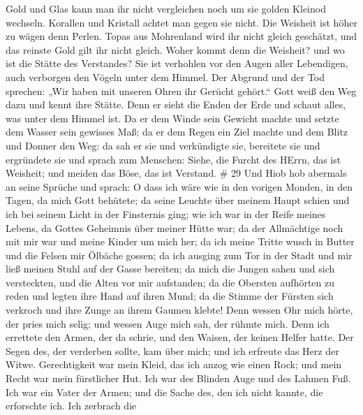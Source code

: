  Gold und Glas kann man ihr nicht vergleichen noch um sie
golden Kleinod wechseln.  Korallen und Kristall achtet man
gegen sie nicht. Die Weisheit ist höher zu wägen denn Perlen.
 Topas aus Mohrenland wird ihr nicht gleich geschätzt, und
das reinste Gold gilt ihr nicht gleich.  Woher kommt denn
die Weisheit? und wo ist die Stätte des Verstandes?  Sie
ist verhohlen vor den Augen aller Lebendigen, auch verborgen den Vögeln
unter dem Himmel.  Der Abgrund und der Tod sprechen: „Wir
haben mit unseren Ohren ihr Gerücht gehört.``  Gott weiß
den Weg dazu und kennt ihre Stätte.  Denn er sieht die
Enden der Erde und schaut alles, was unter dem Himmel ist. 
Da er dem Winde sein Gewicht machte und setzte dem Wasser sein gewisses
Maß;  da er dem Regen ein Ziel machte und dem Blitz und
Donner den Weg:  da sah er sie und verkündigte sie,
bereitete sie und ergründete sie  und sprach zum Menschen:
Siehe, die Furcht des HErrn, das ist Weisheit; und meiden das Böse, das
ist Verstand. \# 29  Und Hiob hob abermals an seine Sprüche
und sprach:  O dass ich wäre wie in den vorigen Monden, in
den Tagen, da mich Gott behütete;  da seine Leuchte über
meinem Haupt schien und ich bei seinem Licht in der Finsternis ging;
 wie ich war in der Reife meines Lebens, da Gottes Geheimnis
über meiner Hütte war;  da der Allmächtige noch mit mir war
und meine Kinder um mich her;  da ich meine Tritte wusch in
Butter und die Felsen mir Ölbäche gossen;  da ich ausging
zum Tor in der Stadt und mir ließ meinen Stuhl auf der Gasse bereiten;
 da mich die Jungen sahen und sich versteckten, und die
Alten vor mir aufstanden;  da die Obersten aufhörten zu
reden und legten ihre Hand auf ihren Mund;  da die Stimme
der Fürsten sich verkroch und ihre Zunge an ihrem Gaumen klebte!
 Denn wessen Ohr mich hörte, der pries mich selig; und
wessen Auge mich sah, der rühmte mich.  Denn ich errettete
den Armen, der da schrie, und den Waisen, der keinen Helfer hatte.
 Der Segen des, der verderben sollte, kam über mich; und
ich erfreute das Herz der Witwe.  Gerechtigkeit war mein
Kleid, das ich anzog wie einen Rock; und mein Recht war mein fürstlicher
Hut.  Ich war des Blinden Auge und des Lahmen Fuß.
 Ich war ein Vater der Armen; und die Sache des, den ich
nicht kannte, die erforschte ich.  Ich zerbrach die
